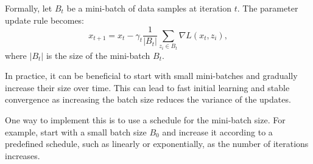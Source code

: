 \documentclass[letter,11pt]{article}
\begin{document}
Formally, let \( B_t \) be a mini-batch of data samples at iteration \( t \). The parameter update rule becomes:
\begin{equation*}
    x_{t+1} = x_t - \gamma_t \frac{1}{|B_t|} \sum_{z_i \in B_t} \nabla L(x_t, z_i),
\end{equation*}
where \( |B_t| \) is the size of the mini-batch \( B_t \).

In practice, it can be beneficial to start with small mini-batches and gradually increase their size over time. This can lead to fast initial learning and stable convergence as increasing the batch size reduces the variance of the updates. 


One way to implement this is to use a schedule for the mini-batch size. For example, start with a small batch size \( B_0 \) and increase it according to a predefined schedule, such as linearly or exponentially, as the number of iterations increases.
\end{document}
